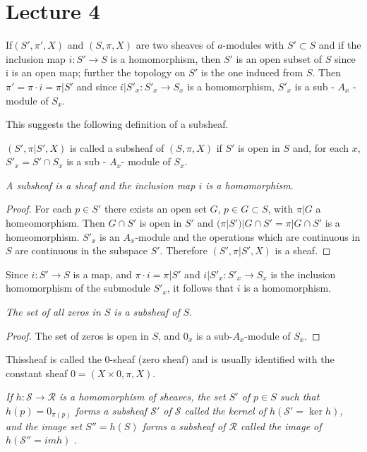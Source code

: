 \chapter{Lecture 4} %

If\pageoriginale $(S', \pi', X)$ and $(S, \pi, X)$ are two sheaves of
$a$-modules with 
$S' \subset S$ and if the inclusion map $i : S' \rightarrow S$ is a
homomorphism, then $S'$ is an open subset of $S$ since i is an open
map; further the topology on $S'$ is the one induced from $S$. Then
$\pi' = \pi \cdot  i = \pi | S'$ and since $i | S'_x : S'_x
\rightarrow S_x$ is a homomorphism, $S'_x$ is a sub - $A_x$ - module
of $S_x$. 

This suggests the following definition of a subsheaf.

\begin{defi*}%
$(S', \pi | S', X)$ is called a subsheaf of $(S, \pi,X)$
  if $S'$ is open in $S$ and, for each $x$, $S'_x = S' \cap S_x$ is a
  sub - $A_x$- module of $S_x$. 
\end{defi*}

\textit{A subsheaf is a sheaf and the inclusion map $i$ is a
  homomorphism}. 

\begin{proof}%
For each $p \in S'$ there exists an open set $G$, $p \in G \subset S$,
with $\pi |  G$ a homeomorphism. Then $G \cap S'$ is open in $S'$
and $(\pi |S') | G \cap S' = \pi  |  G \cap S'$ is a
homeomorphism. $S'_x$ is an $A_x$-module and the operations which are
continuous in $S$ are continuous in the subspace $S'$. Therefore $(S',
\pi  | S', X)$ is a sheaf. 
\end{proof}

Since $i : S' \rightarrow S$ is a map, and $\pi \cdot  i = \pi | S'$ and
$i  | S'_x : S'_x \rightarrow S_x$ is the inclusion homomorphism of
the submodule $S'_x$, it follows that $i$ is a homomorphism. 

\textit{The set of all zeros in $S$ is a subsheaf of} $S$.

\begin{proof}
The set of zeros is open in $S$, and $0_x$ is a sub-$A_x$-module of
$S_x$. 
\end{proof}

This\pageoriginale sheaf is called the 0-sheaf (zero sheaf) and is usually
identified with the constant sheaf $0 = (X \times 0, \pi, X)$. 

\textit{If $h : \mathscr{S} \rightarrow \mathscr{R}$ is a homomorphism
  of sheaves, the set $S'$ of $p \in S$ such that $h(p) = 0_{\pi(p)}$
  forms a subsheaf $\mathscr{S}'$ of $\mathscr{S}$ called the kernel
  of $h(\mathscr{S}' = \ker h)$, and the image set $S'' = h(S)$ forms a
  subsheaf of $\mathscr{R}$ called the image of $h(\mathscr{S}'' = im 
  h)$ }. 

